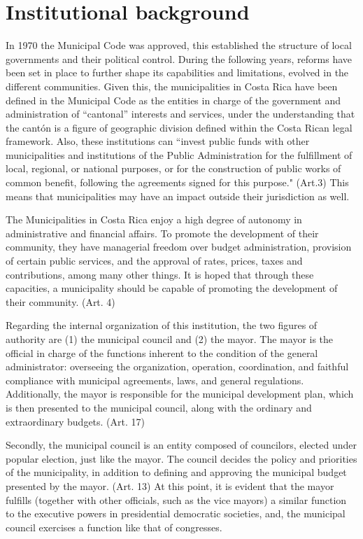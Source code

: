 \section{Institutional background}

In 1970 the Municipal Code was approved, this established the structure of local governments and their political control. During the following years, reforms have been set in place to further shape its capabilities and limitations, evolved in the different communities. \parencite[p. 10]{alfaro2009} Given this, the municipalities in Costa Rica have been defined in the Municipal Code as the entities in charge of the government and administration of “cantonal” interests and services, under the understanding that the cantón is a figure of geographic division defined within the Costa Rican legal framework. \parencite[Art. 3]{al1998} Also, these institutions can “invest public funds with other municipalities and institutions of the Public Administration for the fulfillment of local, regional, or national purposes, or for the construction of public works of common benefit, following the agreements signed for this purpose." (Art.3) This means that municipalities may have an impact outside their jurisdiction as well. 

The Municipalities in Costa Rica enjoy a high degree of autonomy in administrative and financial affairs. To promote the development of their community, they have managerial freedom over budget administration, provision of certain public services, and the approval of rates, prices, taxes and contributions, among many other things. It is hoped that through these capacities, a municipality should be capable of promoting the development of their community. (Art. 4) 

Regarding the internal organization of this institution, the two figures of authority are (1) the municipal council and (2) the mayor. The mayor is the official in charge of the functions inherent to the condition of the general administrator: overseeing the organization, operation, coordination, and faithful compliance with municipal agreements, laws, and general regulations. Additionally, the mayor is responsible for the municipal development plan, which is then presented to the municipal council, along with the ordinary and extraordinary budgets. (Art. 17)

Secondly, the municipal council is an entity composed of councilors, elected under popular election, just like the mayor. The council decides the policy and priorities of the municipality, in addition to defining and approving the municipal budget presented by the mayor. (Art. 13) At this point, it is evident that the mayor fulfills (together with other officials, such as the vice mayors) a similar function to the executive powers in presidential democratic societies, and, the municipal council exercises a function like that of congresses.

